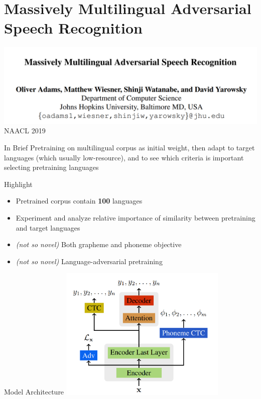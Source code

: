 \documentclass{beamer}
\begin{document}
\section{Massively Multilingual Adversarial Speech Recognition}
\begin{frame}
  \includegraphics[width=\textwidth]{fig/p2-title.png}
  \center NAACL 2019
\end{frame}

\begin{frame}{In Brief}
  Pretraining on multilingual corpus as initial weight, then adapt to target languages (which usually low-resource), and to see which criteria is important selecting pretraining languages
\end{frame}

\begin{frame}{Highlight}
  \begin{itemize}
    \item Pretrained corpus contain \textbf{100} languages
    \item Experiment and analyze relative importance of similarity between pretraining and target languages
    \item \textit{(not so novel)} Both grapheme and phoneme objective
    \item \textit{(not so novel)} Language-adversarial pretraining
  \end{itemize}
\end{frame}

\begin{frame}{Model Architecture}
  \center \includegraphics[width=0.6\textwidth]{fig/p2-arch.png}
\end{frame}
\end{document}
